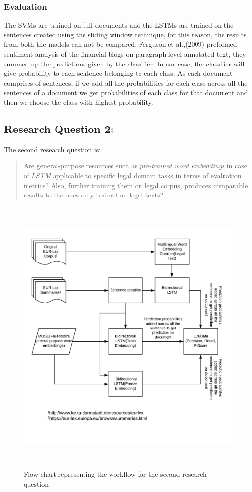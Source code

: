 \subsubsection*{Evaluation} \label{evaluationQuestionOne}
The SVMs are trained on full documents and the LSTMs are trained on the sentences created using the  sliding window technique, for this reason, the results from both the models can not be compared. Ferguson et al.,(2009) \cite{ferguson2009exploring} preformed sentiment analysis of the financial blogs on paragraph-level 
annotated text, they summed up the predictions given by the classifier. In our case, the classifier will give probability to each sentence belonging to each class. As each document comprises of sentences, if we add all the probabilities for each class across all the sentences of a document we get probabilities of each class for that document and then we choose the class with highest probability.
\clearpage
\subsection{Research Question 2:} \label{question2}
The second research question is:

\begin{quote}
    Are general-purpose resources such as \textit{pre-trained word embeddings} in case of \textit{LSTM} applicable to specific legal domain tasks in terms of evaluation metrics? Also, further training them on legal corpus, produces comparable results to the ones only trained on legal texts?
\end{quote}

\begin{figure}[!ht]
    \centering
    \includegraphics[width=15cm, height=14cm,keepaspectratio]{pics/flowforQuestion2.jpeg}
    \caption{Flow chart representing the workflow for the second research question}
    \label{fig:FlowResearchQuestion2}
\end{figure}

